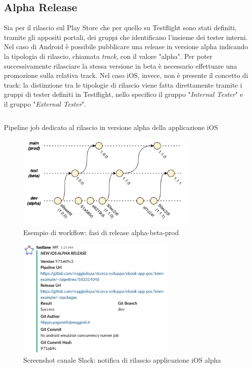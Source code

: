 \subsection{Alpha Release}
Sia per il rilascio sul Play Store che per quello su Testflight sono stati definiti, tramite gli appositi portali, dei gruppi che identificano l'insieme dei tester interni. Nel caso di Android è possibile pubblicare una release in versione alpha indicando la tipologia di rilascio, chiamata \textit{track}, con il valore "alpha". Per poter successivamente rilasciare la stessa versione in beta è necessario effettuare una promozione sulla relativa track. Nel caso iOS, invece, non è presente il concetto di track: la distinzione tra le tipologie di rilascio viene fatta direttamente tramite i gruppi di tester definiti in Testflight, nello specifico il gruppo "\textit{Internal Tester}" e il gruppo "\textit{External Tester}".

\begin{listing}[H]
\inputminted{yaml}{code/4-ios-alpha}
\caption{Pipeline job dedicato al rilascio in versione alpha della applicazione iOS}
\end{listing}

\begin{figure}[H]
\centering
\includegraphics[width=0.8\textwidth]{img/tesi-18-release-flow.drawio.png}
\caption{Esempio di workflow: fasi di release alpha-beta-prod}
\end{figure}

\begin{figure}[H]
\centering
\includegraphics[width=0.7\textwidth]{img/Screenshot 2022-07-08 at 17.48.40.png}
\caption{Screenshot canale Slack: notifica di rilascio applicazione iOS alpha}
\end{figure}

